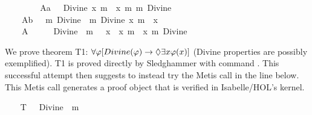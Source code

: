 \begin{isabellebody}
\begin{isamarkuptext}
\imp Divine(\psi)]$ (A property necessarily implied by a divine property is divine).%
\end{isamarkuptext}%
\isamarkuptrue%
\ \ \isamarkupfalse%
\ \isanewline
\ \ \ \ A{}a{\isacharcolon}\ {\isachardoublequoteopen}{\isacharbrackleft}{\isasymPi}\ {\isacharparenleft}{\isasymlambda}{\isasymPhi}{\isachardot}\ Divine\ {\isacharparenleft}{\isasymlambda}x{\isachardot}\ m{\isasymnot}\ {\isacharparenleft}{\isasymPhi}\ x{\isacharparenright}{\isacharparenright}\ m{\isasymRightarrow}\ m{\isasymnot}\ {\isacharparenleft}Divine\ {\isasymPhi}{\isacharparenright}{\isacharparenright}{\isacharbrackright}{\isachardoublequoteclose}\ \isanewline
\ \ \ \ A{}b{\isacharcolon}\ {\isachardoublequoteopen}{\isacharbrackleft}{\isasymPi}\ {\isacharparenleft}{\isasymlambda}{\isasymPhi}{\isachardot}\ m{\isasymnot}\ {\isacharparenleft}Divine\ {\isasymPhi}{\isacharparenright}\ m{\isasymRightarrow}\ Divine\ {\isacharparenleft}{\isasymlambda}x{\isachardot}\ m{\isasymnot}\ {\isacharparenleft}{\isasymPhi}\ x{\isacharparenright}{\isacharparenright}{\isacharparenright}{\isacharbrackright}{\isachardoublequoteclose}\ \isanewline
\ \ \ \ A{}{\isacharcolon}\ \ {\isachardoublequoteopen}{\isacharbrackleft}{\isasymPi}\ {\isacharparenleft}{\isasymlambda}{\isasymPhi}{\isachardot}\ {\isasymPi}\ {\isacharparenleft}{\isasymlambda}{\isasympsi}{\isachardot}\ {\isacharparenleft}Divine\ {\isasymPhi}\ m{\isasymand}\ {\isasymbox}\ {\isacharparenleft}{\isasymforall}\ {\isacharparenleft}{\isasymlambda}x{\isachardot}\ {\isasymPhi}\ x\ m{\isasymRightarrow}\ {\isasympsi}\ x{\isacharparenright}{\isacharparenright}{\isacharparenright}\ m{\isasymRightarrow}\ Divine\ {\isasympsi}{\isacharparenright}{\isacharparenright}{\isacharbrackright}{\isachardoublequoteclose}%
\begin{isamarkuptext}%
We prove theorem T1: $\all {}$ (Divine 
properties are possibly exemplified). T1 is proved directly by Sledghammer with command . This successful attempt then suggests to 
instead try the Metis call in the line below. This Metis call generates a proof object 
that is verified in Isabelle/HOL's kernel.%
\end{isamarkuptext}%
\isamarkuptrue%
\ \ \isamarkupfalse%
\ T{}{\isacharcolon}\ {\isachardoublequoteopen}{\isacharbrackleft}{\isasymPi}\ {\isacharparenleft}{\isasymlambda}{\isasymPhi}{\isachardot}\ Divine\ {\isasymPhi}\ m{\isasymRightarrow}\ {\isasymdiamond}\ {\isacharparenleft}{\isasymexists}\ {\isasymPhi}{\isacharparenright}{\isacharparenright}{\isacharbrackright}{\isachardoublequoteclose}\ \ \isanewline

\end{isabellebody}
